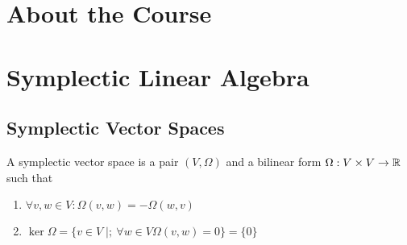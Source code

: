 \setcounter{chapter}{-1}
\chapter{About the Course} \label{chap:about_the_course}


\chapter{Symplectic Linear Algebra} \label{chap:symplectic_linear_algebra}
\section{Symplectic Vector Spaces} \label{sec:symplectic_vector_spaces}
\begin{definition}
	A symplectic vector space is a pair $(V,\Omega)$ and a bilinear form $\Omega: V \times  V \to \mathbb{R}$ such that 
	\begin{enumerate}
		\item $\forall v, w \in V: \Omega(v, w) = - \Omega(w,v)$
		\item $\ker \Omega = \{v \in V \;|;\ \forall w \in V \Omega(v, w) = 0\}  = \{0\} $
	\end{enumerate}
\end{definition}

